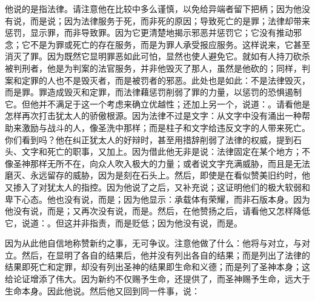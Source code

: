 他说的是指法律。请注意他在比较中多么谨慎，以免给异端者留下把柄；因为他没有说，而是说；因为法律服务于死，而非死的原因；导致死亡的是罪；法律却带来惩罚，显示罪，而非导致罪。因为它更清楚地揭示邪恶并惩罚它；它没有推动邪念；它不是为罪或死亡的存在服务，而是为罪人承受报应服务。这样说来，它甚至消灭了罪。因为既然它显明罪恶如此可怕，显然也使人避免它。就如有人持刀砍杀被判刑者，他是为判案的法官服务，并非他毁灭了那人，虽然是他砍的；同样，判案和定罪的人也不是毁灭者，而是被罚者的邪恶。此处也是如此：不是法律毁灭，而是罪。罪造成毁灭和定罪，而法律藉惩罚削弱了罪的力量，以惩罚的恐惧遏制它。但他并不满足于这一个考虑来确立优越性；还加上另一个，说道：。请看他是怎样再次打击犹太人的骄傲根源。因为法律不过是文字：从文字中没有涌出一种帮助来激励与战斗的人，像圣洗中那样；而是柱子和文字给违反文字的人带来死亡。你们看到吗？他在纠正犹太人的好辩时，甚至用措辞削弱了法律的权威，提到石头、文字和死亡的职事，又加上。因为借此他无非是说：法律固定在某个地方；不像圣神那样无所不在，向众人吹入极大的力量；或者说文字充满威胁，而且是无法磨灭、永远留存的威胁，因为是刻在石头上。然后，即使是在看似赞美旧约时，他又掺入了对犹太人的指控。因为他说了之后，又补充说；这证明他们的极大软弱和卑下心态。他也没有说，而是；因为他显示：承载体有荣耀，而非石版本身。因为他没有说，而是；又再次没有说，而是。然后，在他赞扬之后，请看他又怎样降低它，说道：。但这并非指责，而是贬低；因为他没有说，而是。\par

因为从此他自信地称赞新约之事，无可争议。注意他做了什么：他将与对立，与对立。然后，在显明了各自的结果后，他并没有列出各自的结果；而是列出了法律的结果即死亡和定罪，却没有列出圣神的结果即生命和义德；而是列了圣神本身；这给论证增添了伟大。因为新约不仅赐予生命，还提供了，而圣神赐予生命，远大于生命本身。因此他说。然后他又回到同一件事，说：\par


\subsection{}

